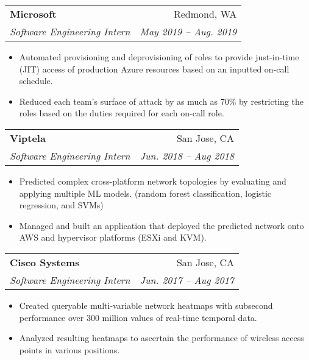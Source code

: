 \documentclass[letterpaper,11pt]{article}
\makeatletter
\newcommand{\resumeItem}[1]{
    \item\small{
            {#1 \vspace{-2pt}}
    }
}
\newcommand{\resumeSubheading}[4]{
    \vspace{-2pt}\item
    \begin{tabular*}{0.97\textwidth}[t]{l@{\extracolsep{\fill}}r}
        \textbf{#1}       & #2                 \\
        \textit{\small#3} & \textit{\small #4} \\
    \end{tabular*}\vspace{-7pt}
}
\newcommand{\resumeSubSubheading}[2]{
    \item
    \begin{tabular*}{0.97\textwidth}{l@{\extracolsep{\fill}}r}
        \textit{\small#1} & \textit{\small #2} \\
    \end{tabular*}\vspace{-7pt}
}
\newcommand{\resumeSubHeadingListEnd}{\end{itemize}}
\newcommand{\resumeItemListStart}{\begin{itemize}}
\newcommand{\resumeItemListEnd}{\end{itemize}\vspace{-5pt}}
\makeatother
\begin{document}


\resumeSubheading
{Microsoft}{Redmond, WA}
{Software Engineering Intern}{May 2019 -- Aug. 2019}

\resumeItemListStart
\resumeItem{Automated provisioning and deprovisioning of roles to provide just-in-time (JIT) access of production Azure resources based on an inputted on-call schedule.}
\resumeItem{Reduced each team's surface of attack by as much as 70\% by restricting the roles based on the duties required for each on-call role.}
\resumeItemListEnd

\resumeSubheading
{Viptela}{San Jose, CA}
{Software Engineering Intern}{Jun. 2018 -- Aug 2018}
\resumeItemListStart
\resumeItem{Predicted complex cross-platform network topologies by evaluating and applying multiple ML models. (random forest classification, logistic regression, and SVMs)}
\resumeItem{Managed and built an application that deployed the predicted network onto AWS and hypervisor platforms (ESXi and KVM).}
\resumeItemListEnd

\resumeSubheading
{Cisco Systems}{San Jose, CA}
{Software Engineering Intern}{Jun. 2017 -- Aug 2017}
\resumeItemListStart
\resumeItem{Created queryable multi-variable network heatmaps with subsecond performance over 300 million values of real-time temporal data.}
\resumeItem{Analyzed resulting heatmaps to ascertain the performance of wireless access points in various positions.}
\resumeItemListEnd

\end{document}
